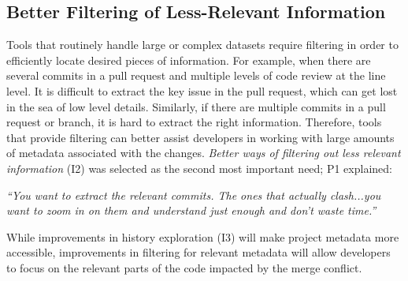 \subsection{Better Filtering of Less-Relevant Information}\label{better_filtering}
Tools that routinely handle large or complex datasets require filtering in order to efficiently locate desired pieces of information.
For example, when there are several commits in a pull request and multiple levels of code review at the line level.
It is difficult to extract the key issue in the pull request, which can get lost in the sea of low level details. Similarly, if there are multiple commits in a pull request or branch, it is hard to extract the right information.
Therefore, tools that provide filtering can better assist developers in working with large amounts of metadata associated with the changes.
\textit{Better ways of filtering out less relevant information} (I2) was selected as the second most important need; P1 explained:
\begin{quoting}
\textit{``You want to extract the relevant commits. The ones that actually clash...you want to zoom in on them and understand just enough and don't waste time.''}
\end{quoting}

While improvements in history exploration (I3) will make project metadata more accessible, improvements in filtering for relevant metadata will allow developers to focus on the relevant parts of the code impacted by the merge conflict.

